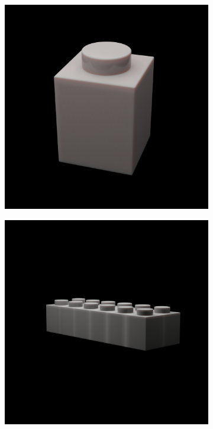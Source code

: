 \documentclass[]{article}
\begin{document}
\begin{figure}[h]
    \centering
    \begin{subfigure}[b]{0.2\textwidth}
        \includegraphics[width=\textwidth]{generated images/25.png}
    \end{subfigure}
    \begin{subfigure}[b]{0.2\textwidth}
        \includegraphics[width=\textwidth]{generated images/26.png}

\end{subfigure}
\end{figure}
\end{document}
